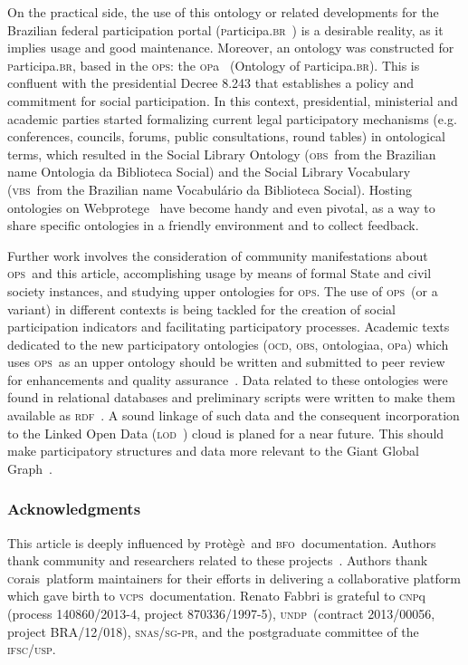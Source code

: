 \documentclass[10pt,letterpaper]{article}
\newcommand{\ops}{\textsc{ops}}
\newcommand{\vcps}{\textsc{vcps}}
\newcommand{\bfo}{\textsc{bfo}}
\newcommand{\opa}{\textsc{op}a}
\newcommand{\ocd}{\textsc{ocd}}
\newcommand{\ontologiaa}{\textsc{o}ntologiaa}
\newcommand{\obs}{\textsc{obs}}
\newcommand{\rdf}{\textsc{rdf}}
\newcommand{\participa}{\textsc{p}articipa.\textsc{br}}
\newcommand{\pnud}{\textsc{undp}}
\newcommand{\vbs}{\textsc{vbs}}
\newcommand{\lod}{\textsc{lod}}
\newcommand{\corais}{\textsc{c}orais}
\newcommand{\protege}{\textsc{p}rot\`eg\`e}
\begin{document}
On the practical side, the use of this ontology or related developments
for the Brazilian federal participation portal (\participa~\cite{participa}) is a desirable reality,
as it implies usage and good maintenance.
Moreover, an ontology was constructed for \participa, based in the \ops: the \opa~\cite{pnud5} (Ontology of \participa).
This is confluent with the presidential Decree 8.243 that establishes a policy and commitment for social participation\cite{decree}.
In this context, presidential, ministerial and academic parties started formalizing current
legal participatory mechanisms (e.g. conferences, councils, forums, public consultations, round tables)
in ontological terms, which resulted in the Social Library Ontology 
(\obs\ from the Brazilian name Ontologia da Biblioteca Social)
and the Social Library Vocabulary (\vbs\ from the Brazilian name Vocabul\'ario da Biblioteca Social).
Hosting ontologies on Webprotege~\cite{webprotege} have become handy and even pivotal,
as a way to share specific ontologies in a friendly environment and to collect feedback.

Further work involves the consideration of community manifestations about \ops\ and this article,
accomplishing usage by means of formal State and civil society instances,
and studying upper ontologies for \ops.
The use of \ops\ (or a variant) in different contexts
is being tackled for the creation of social participation 
indicators and facilitating participatory processes.
Academic texts dedicated to the new participatory ontologies 
(\ocd, \obs, \ontologiaa, \opa) which uses \ops\ as an upper ontology
should be written and submitted to peer review for enhancements and quality assurance~\cite{pnud5}.
Data related to these ontologies were found in relational databases 
and preliminary scripts were written to make them available as \rdf~\cite{datahub}.
A sound linkage of such data and the consequent incorporation
to the Linked Open Data (\lod~\cite{lod}) cloud is planed for a near future.
This should make participatory structures and data more relevant to the Giant Global Graph~\cite{ggg}.

\subsubsection*{Acknowledgments}
This article is deeply influenced by \protege\ and \bfo\ documentation.
Authors thank community and researchers related to these projects~\cite{protege,bfo}.
Authors thank \corais\ platform maintainers for their efforts 
in delivering a collaborative platform which gave birth to \vcps\ documentation.
Renato Fabbri is grateful to \textsc{cnp}q (process 140860/2013-4, project 870336/1997-5),
\pnud\ (contract 2013/00056, project BRA/12/018), \textsc{snas/sg-pr},
and the postgraduate committee of the \textsc{ifsc/usp}.
\end{document}
